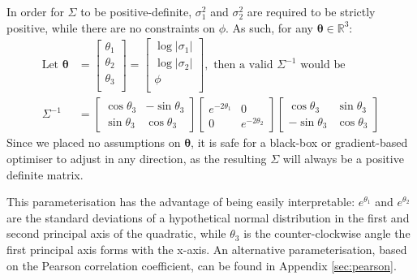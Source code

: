 \documentclass[a4paper, 12pt]{report}
\begin{document}
In order for $\Sigma$ to be positive-definite, $\sigma_1^2$ and $\sigma_2^2$ are required to be strictly positive, while there are no constraints on $\phi$. As such, for any $\boldsymbol{\theta}\in\mathbb{R}^3$:
\begin{align}
\textrm{Let }\boldsymbol{\theta}&=\begin{bmatrix}
	\theta_1\\
	\theta_2\\
	\theta_3\\
\end{bmatrix}=\begin{bmatrix}
	\log|\sigma_1| \\
	\log|\sigma_2|\\
	\phi\\
\end{bmatrix}, \textrm{ then a valid $\Sigma^{-1}$ would be} \\
\Sigma^{-1} &= \begin{bmatrix}
	\cos \theta_3 & -\sin \theta_3 \\ \sin\theta_3 & \cos\theta_3
\end{bmatrix}\begin{bmatrix}
	 e^{-2\theta_1} & 0\\ 0 &  e^{-2\theta_2}
\end{bmatrix} \begin{bmatrix}
	\cos \theta_3 & \sin \theta_3 \\ -\sin\theta_3 & \cos\theta_3
\end{bmatrix}
\end{align}
Since we placed no assumptions on $\boldsymbol{\theta}$, it is safe for a black-box or gradient-based optimiser to adjust in any direction, as the resulting $\Sigma$ will always be a positive definite matrix.

This parameterisation has the advantage of being easily interpretable: $e^{\theta_1}$ and $e^{\theta_2}$ are the standard deviations of a hypothetical normal distribution in the first and second principal axis of the quadratic, while $\theta_3$ is the counter-clockwise angle the first principal axis forms with the x-axis. An alternative parameterisation, based on the Pearson correlation coefficient, can be found in Appendix \ref{sec:pearson}.
\end{document}

